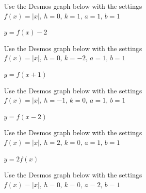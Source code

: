 \documentclass{ximera}
\begin{document}
\begin{question}
\begin{problem}
\begin{solution}
Use the Desmos graph below with the settings $f(x)=|x|,\,h=0,\,k=1,\,a=1,\,b=1$

\begin{center} 
\end{center}
\end{solution} 
\end{problem}

\begin{problem}
$y = f(x) - 2$

\begin{solution}
Use the Desmos graph below with the settings $f(x)=|x|,\,h=0,\,k=-2,\,a=1,\,b=1$

\begin{center} 
\end{center}
\end{solution} 
\end{problem}

\begin{problem}
$y = f(x+1)$   

\begin{solution}
Use the Desmos graph below with the settings $f(x)=|x|,\,h=-1,\,k=0,\,a=1,\,b=1$

\begin{center} 
\end{center}
\end{solution} 
\end{problem}

\begin{problem}
$y = f(x - 2)$

\begin{solution}
Use the Desmos graph below with the settings $f(x)=|x|,\,h=2,\,k=0,\,a=1,\,b=1$

\begin{center} 
\end{center}
\end{solution} 
\end{problem}

\begin{problem}
$y = 2f(x)$

\begin{solution}
Use the Desmos graph below with the settings $f(x)=|x|,\,h=0,\,k=0,\,a=2,\,b=1$

\begin{center} 
\end{center}
\end{solution} 
\end{problem}


\end{question}
\end{document}
